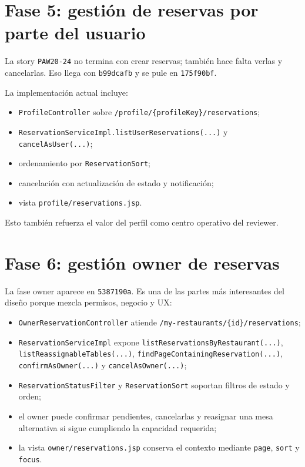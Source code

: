 \documentclass[11pt,a4paper]{report}
\newcommand{\commit}[1]{\texttt{#1}}
\newcommand{\code}[1]{\nolinkurl{#1}}
\newcommand{\story}[1]{\texttt{#1}}
\begin{document}
\section{Fase 5: gesti\'on de reservas por parte del usuario}

La story \story{PAW20-24} no termina con crear reservas; tambi\'en hace falta verlas y cancelarlas. Eso llega con \commit{b99dcafb} y se pule en \commit{175f90bf}.

La implementaci\'on actual incluye:

\begin{itemize}
  \item \code{ProfileController} sobre \code{/profile/\{profileKey\}/reservations};
  \item \code{ReservationServiceImpl.listUserReservations(...)} y \code{cancelAsUser(...)};
  \item ordenamiento por \code{ReservationSort};
  \item cancelaci\'on con actualizaci\'on de estado y notificaci\'on;
  \item vista \code{profile/reservations.jsp}.
\end{itemize}

Esto tambi\'en refuerza el valor del perfil como centro operativo del reviewer.

\section{Fase 6: gesti\'on owner de reservas}

La fase owner aparece en \commit{5387190a}. Es una de las partes m\'as interesantes del dise\~no porque mezcla permisos, negocio y UX:

\begin{itemize}
  \item \code{OwnerReservationController} atiende \code{/my-restaurants/\{id\}/reservations};
  \item \code{ReservationServiceImpl} expone \code{listReservationsByRestaurant(...)}, \code{listReassignableTables(...)}, \code{findPageContainingReservation(...)}, \code{confirmAsOwner(...)} y \code{cancelAsOwner(...)};
  \item \code{ReservationStatusFilter} y \code{ReservationSort} soportan filtros de estado y orden;
  \item el owner puede confirmar pendientes, cancelarlas y reasignar una mesa alternativa si sigue cumpliendo la capacidad requerida;
  \item la vista \code{owner/reservations.jsp} conserva el contexto mediante \code{page}, \code{sort} y \code{focus}.
\end{itemize}
\end{document}
